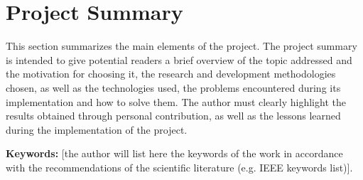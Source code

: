 \chapter*{Project Summary}
This section summarizes the main elements of the project. The project summary is intended to give potential readers a brief overview of the topic addressed and the motivation for choosing it, the research and development methodologies chosen, as well as the technologies used, the problems encountered during its implementation and how to solve them. The author must clearly highlight the results obtained through personal contribution, as well as the lessons learned during the implementation of the project.


\begin{flushleft}
\textbf{Keywords:} [the author will list here the keywords of the work in accordance with the recommendations of the scientific literature (e.g. IEEE keywords list)].
\end{flushleft}

